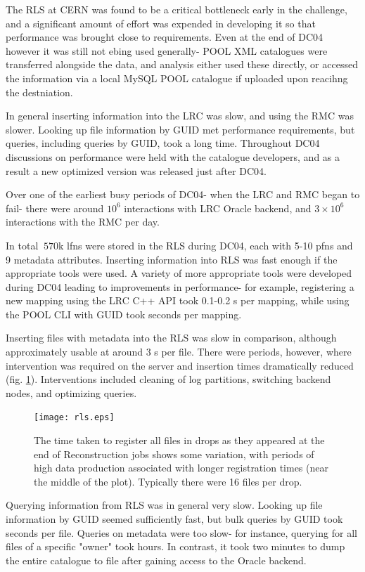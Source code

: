 \documentclass{cmspaper}
\begin{document}
The RLS at CERN was found to be a critical bottleneck early in the challenge, and a significant amount of effort was expended in developing it so that performance was brought close to requirements. Even at the end of DC04 however it was still not ebing used generally- POOL XML catalogues were transferred alongside the data, and analysis either used these directly, or accessed the information via a local MySQL POOL catalogue if uploaded upon reacihng the destniation.

In general inserting information into the LRC was slow, and using the RMC was slower. Looking up file information by GUID met performance requirements, but queries, including queries by GUID, took a long time. Throughout DC04 discussions on performance were held with the catalogue developers, and as a result a new optimized version was released just after DC04.

Over one of the earliest busy periods of DC04- when the LRC and RMC began to fail- there were around $10^6$ interactions with LRC Oracle backend, and $3\times10^6$ interactions with the RMC per day. 

In total $~570$k lfns were stored in the RLS during DC04, each with 5-10 pfns and 9 metadata attributes. Inserting information into RLS was fast enough if  the appropriate tools were used. A variety of more appropriate tools were developed during DC04 leading to improvements in performance- for example, registering a new mapping using the LRC C++ API took 0.1-0.2 s per mapping, while using the POOL CLI with GUID took seconds per mapping.

Inserting files with metadata into the RLS was slow in comparison, although approximately usable at around 3 s per file. There were periods, however, where intervention was required on the server and insertion times dramatically reduced (fig. \ref{fig:rls}). Interventions included cleaning of log partitions, switching backend nodes, and optimizing queries.

\begin{figure}[tbp]
\centering
\texttt{[image: rls.eps]}
\label{fig:rls}
\caption{The time taken to register all files in drops as they appeared at the end of Reconstruction jobs shows some variation, with periods of high data production associated with longer registration times (near the middle of the plot). Typically there were 16 files per drop.}
\end{figure} 

Querying information from RLS was in general very slow. Looking up file information by GUID seemed sufficiently fast, but bulk queries by GUID took seconds per file. Queries on metadata were too slow- for instance, querying for all files of a specific "owner" took hours. In contrast, it took two minutes to dump the entire catalogue to file after gaining access to the Oracle backend.
\end{document}
